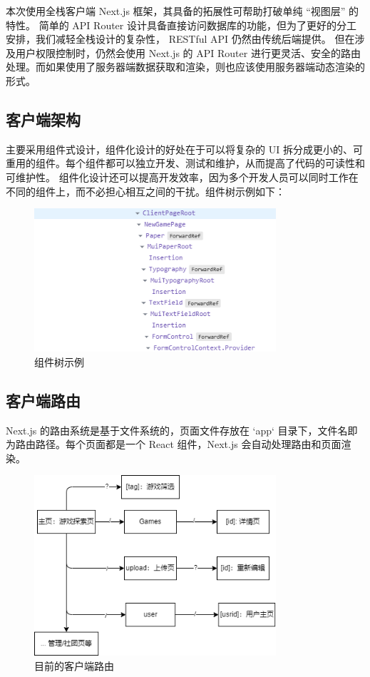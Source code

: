 \documentclass[12pt]{ctexart} %
\begin{document}
本次使用全栈客户端 Next.js 框架，其具备的拓展性可帮助打破单纯 “视图层” 的特性。
简单的 API Router 设计具备直接访问数据库的功能，但为了更好的分工安排，我们减轻全栈设计的复杂性， RESTful API 仍然由传统后端提供。
但在涉及用户权限控制时，仍然会使用 Next.js 的 API Router 进行更灵活、安全的路由处理。而如果使用了服务器端数据获取和渲染，则也应该使用服务器端动态渲染的形式。

\subsection{客户端架构}

主要采用组件式设计，组件化设计的好处在于可以将复杂的 UI 拆分成更小的、可重用的组件。每个组件都可以独立开发、测试和维护，从而提高了代码的可读性和可维护性。
组件化设计还可以提高开发效率，因为多个开发人员可以同时工作在不同的组件上，而不必担心相互之间的干扰。组件树示例如下：

\begin{figure}[H]
  \centering
  \includegraphics[width=0.8\textwidth]{Client-tree.png}
  \caption{组件树示例}
\end{figure}

\subsection{客户端路由}

Next.js 的路由系统是基于文件系统的，页面文件存放在 `app` 目录下，文件名即为路由路径。每个页面都是一个 React 组件，Next.js 会自动处理路由和页面渲染。

\begin{figure}[H]
  \centering
  \includegraphics[width=0.8\textwidth]{Client-arch.png}
  \caption{目前的客户端路由}
\end{figure}
\end{document}
